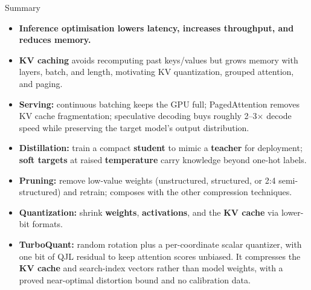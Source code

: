 \begin{frame}{Summary}
  \begin{itemize}\footnotesize
    \item[\textcolor{red}{$\blacktriangleright$}] \textbf{Inference optimisation lowers latency, increases throughput, and reduces memory.}
    \item[\textcolor{red}{$\blacktriangleright$}] \textbf{KV caching} avoids recomputing past keys/values but grows memory with layers, batch, and length, motivating KV quantization, grouped attention, and paging.
    \item[\textcolor{red}{$\blacktriangleright$}] \textbf{Serving:} continuous batching keeps the GPU full; PagedAttention removes KV cache fragmentation; speculative decoding buys roughly 2--3$\times$ decode speed while preserving the target model's output distribution.
    \item[\textcolor{red}{$\blacktriangleright$}] \textbf{Distillation:} train a compact \textbf{student} to mimic a \textbf{teacher} for deployment; \textbf{soft targets} at raised \textbf{temperature} carry knowledge beyond one-hot labels.
    \item[\textcolor{red}{$\blacktriangleright$}] \textbf{Pruning:} remove low-value weights (unstructured, structured, or 2:4 semi-structured) and retrain; composes with the other compression techniques.
    \item[\textcolor{red}{$\blacktriangleright$}] \textbf{Quantization:} shrink \textbf{weights}, \textbf{activations}, and the \textbf{KV cache} via lower-bit formats.
    \item[\textcolor{red}{$\blacktriangleright$}] \textbf{TurboQuant:} random rotation plus a per-coordinate scalar quantizer, with one bit of QJL residual to keep attention scores unbiased. It compresses the \textbf{KV cache} and search-index vectors rather than model weights, with a proved near-optimal distortion bound and no calibration data.
  \end{itemize}
\end{frame}
